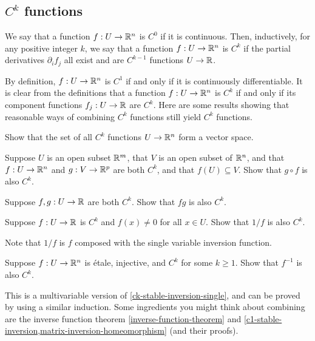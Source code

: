 \subsection{\texorpdfstring{$C^k$}{Ck} functions}

\begin{definition}[$C^k$ functions] \label{ck} 
	We say that a function $f : U \to \mathbb{R}^n$ is $C^0$ if it is continuous. Then, inductively, for any positive integer $k$, we say that a function $f : U \to \mathbb{R}^n$ is $C^k$ if the partial derivatives $\partial_i f_j$ all exist and are $C^{k-1}$ functions $U \to \mathbb{R}$. 
\end{definition}

By definition, $f : U \to \mathbb{R}^n$ is $C^1$ if and only if it is continuously differentiable. It is clear from the definitions that a function $f : U \to \mathbb{R}^n$ is $C^k$ if and only if its component functions $f_j : U \to \mathbb{R}$ are $C^k$. Here are some results showing that reasonable ways of combining $C^k$ functions still yield $C^k$ functions. 

\begin{exercise} \label{ck-stable-sum-scalar}
	Show that the set of all $C^k$ functions $U \to \mathbb{R}^n$ form a vector space. 
\end{exercise} 

\begin{exercise} \label{ck-stable-composite}
	Suppose $U$ is an open subset $\mathbb{R}^m$, that $V$ is an open subset of $\mathbb{R}^n$, and that $f : U \to \mathbb{R}^n$ and $g : V \to \mathbb{R}^p$ are both $C^k$, and that $f(U) \subseteq V$. Show that $g \circ f$ is also $C^k$. 
\end{exercise}

\begin{exercise} \label{ck-stable-product}
	Suppose $f, g : U \to \mathbb{R}$ are both $C^k$. Show that $fg$ is also $C^k$. 
\end{exercise}

\begin{exercise} \label{ck-stable-reciprocal}
	Suppose $f : U \to \mathbb{R}$ is $C^k$ and $f(x) \neq 0$ for all $x \in U$. Show that $1/f$ is also $C^k$.
	\begin{hint}
		Note that $1/f$ is $f$ composed with the single variable inversion function. 
	\end{hint}
\end{exercise}

\begin{exercise} \label{ck-stable-inversion}
	Suppose $f : U \to \mathbb{R}^n$ is \'etale, injective, and $C^k$ for some $k \geq 1$. Show that $f^{-1}$ is also $C^k$. 
	\begin{hint}
		This is a multivariable version of \cref{ck-stable-inversion-single}, and can be proved by using a similar induction. Some ingredients you might think about combining are the inverse function theorem \ref{inverse-function-theorem} and  \cref{c1-stable-inversion,matrix-inversion-homeomorphism} (and their proofs). 
	\end{hint}
\end{exercise}

